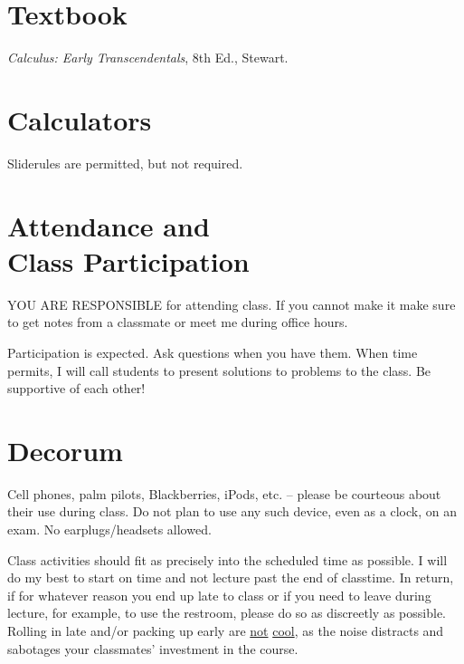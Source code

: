 \documentclass[margin,line,pifont,palatino,courier]{res}
\newenvironment{list2}{
  \begin{list}{$\bullet$}{%
      \setlength{\itemsep}{0in}
      \setlength{\parsep}{0in} \setlength{\parskip}{0in}
      \setlength{\topsep}{0in} \setlength{\partopsep}{0in}
      \setlength{\leftmargin}{0.2in}}}{\end{list}}
\begin{document}
\begin{resume}
\vspace{0.25pc}
\section{\sc Textbook}  \emph{Calculus: Early Transcendentals}, 8th Ed., Stewart.  

\section{\sc Calculators} Sliderules are permitted, but not required.  %


\section{\sc Attendance and \\ Class Participation} YOU ARE RESPONSIBLE for attending class.  If you cannot make it make sure to get notes from a classmate or meet me during office hours. 

Participation is expected.  Ask questions when you have them.  When time permits, I will call students to present solutions to problems to the class.  Be supportive of each other!    

\section{\sc Decorum} Cell phones, palm pilots, Blackberries, iPods, etc. -- please be courteous about their use during class.  Do not plan to use any such device, even as a clock, on an exam. No earplugs/headsets allowed.

Class activities should fit as precisely into the scheduled time as possible.   I will do my best to start on time and not lecture past the end of classtime.  In return, if for whatever reason you end up late to class or if you need to leave during lecture, for example, to use the restroom, please do so as discreetly as possible.  Rolling in late and/or packing up early are \underline{not} \underline{cool}, as the noise distracts and sabotages your classmates' investment in the course. 


\end{resume}
\end{document}
